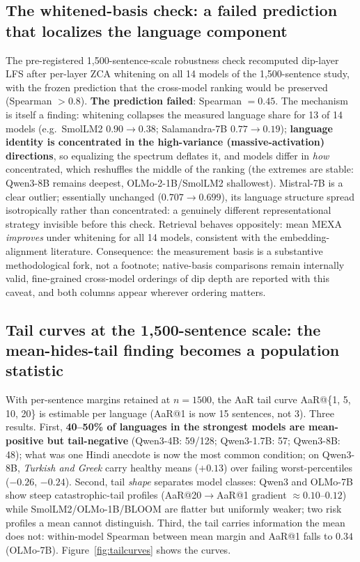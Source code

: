 \documentclass[11pt,a4paper]{article}
\begin{document}
\subsection{The whitened-basis check: a failed prediction that localizes
the language component}
The pre-registered 1,500-sentence-scale robustness check recomputed dip-layer LFS
after per-layer ZCA whitening on all 14 models of the 1,500-sentence study, with the frozen
prediction that the cross-model ranking would be preserved (Spearman
$> 0.8$). \textbf{The prediction failed}: Spearman $= 0.45$. The mechanism
is itself a finding: whitening collapses the measured language share for 13
of 14 models (e.g.\ SmolLM2 $0.90 \to 0.38$; Salamandra-7B $0.77 \to 0.19$); \textbf{language identity is concentrated in the high-variance
(massive-activation) directions}, so equalizing the spectrum deflates it,
and models differ in \emph{how} concentrated, which reshuffles the middle
of the ranking (the extremes are stable: Qwen3-8B remains deepest,
OLMo-2-1B/SmolLM2 shallowest). Mistral-7B is a clear outlier; essentially unchanged ($0.707 \to 0.699$), its language structure spread
isotropically rather than concentrated: a genuinely different
representational strategy invisible before this check. Retrieval behaves
oppositely: mean MEXA \emph{improves} under whitening for all 14 models,
consistent with the embedding-alignment literature. Consequence: the
measurement basis is a substantive methodological fork, not a footnote;
native-basis comparisons remain internally valid, fine-grained cross-model
orderings of dip depth are reported with this caveat, and both columns
appear wherever ordering matters.

\subsection{Tail curves at the 1,500-sentence scale: the mean-hides-tail finding
becomes a population statistic}
With per-sentence margins retained at $n = 1500$, the AaR tail curve
AaR@\{1, 5, 10, 20\} is estimable per language (AaR@1 is now 15 sentences,
not 3). Three results. First, \textbf{40--50\% of languages in the
strongest models are mean-positive but tail-negative} (Qwen3-4B: 59/128;
Qwen3-1.7B: 57; Qwen3-8B: 48); what was one Hindi anecdote is now the
most common condition; on Qwen3-8B, \emph{Turkish and Greek} carry healthy means
($+0.13$) over failing worst-percentiles ($-0.26$, $-0.24$). Second, tail
\emph{shape} separates model classes: Qwen3 and OLMo-7B show steep
catastrophic-tail profiles (AaR@20$\to$AaR@1 gradient $\approx 0.10$--$0.12$)
while SmolLM2/OLMo-1B/BLOOM are flatter but uniformly weaker; two risk
profiles a mean cannot distinguish. Third, the tail carries information the
mean does not: within-model Spearman between mean margin and AaR@1 falls to
$0.34$ (OLMo-7B). Figure~\ref{fig:tailcurves} shows the curves.
\end{document}

